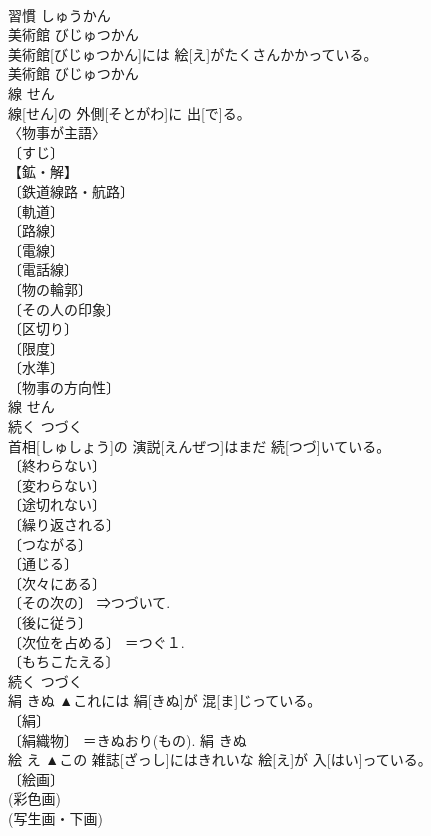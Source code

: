 \documentclass[8pt]{extreport}
\begin{document}
\begin{CJK}{UTF8}{min}
\\	習慣	しゅうかん	
\\	美術館	びじゅつかん	
\\	美術館[びじゅつかん]には 絵[え]がたくさんかかっている。	
\\	美術館	びじゅつかん	
\\	線	せん	
\\	線[せん]の 外側[そとがわ]に 出[で]る。	
\\	〈物事が主語〉 
\\	〔すじ〕 
\\	【鉱・解】 
\\	〔鉄道線路・航路〕 
\\	〔軌道〕 
\\	〔路線〕 
\\	〔電線〕 
\\	〔電話線〕 
\\	〔物の輪郭〕 
\\	〔その人の印象〕 
\\	〔区切り〕 
\\	〔限度〕 
\\	〔水準〕 
\\	〔物事の方向性〕 
\\	線	せん	
\\	続く	つづく	
\\	首相[しゅしょう]の 演説[えんぜつ]はまだ 続[つづ]いている。	
\\	〔終わらない〕 
\\	〔変わらない〕 
\\	〔途切れない〕 
\\	〔繰り返される〕 
\\	〔つながる〕 
\\	〔通じる〕 
\\	〔次々にある〕 
\\	〔その次の〕 ⇒つづいて. 
\\	〔後に従う〕 
\\	〔次位を占める〕 ＝つぐ１. 
\\	〔もちこたえる〕 
\\	続く	つづく	
\\	絹	きぬ	▲これには 絹[きぬ]が 混[ま]じっている。	
\\	〔絹〕 
\\	〔絹織物〕 ＝きぬおり(もの).	絹	きぬ	
\\	絵	え	▲この 雑誌[ざっし]にはきれいな 絵[え]が 入[はい]っている。	
\\	〔絵画〕 
\\	(彩色画) 
\\	(写生画・下画) 

\end{CJK}
\end{document}
